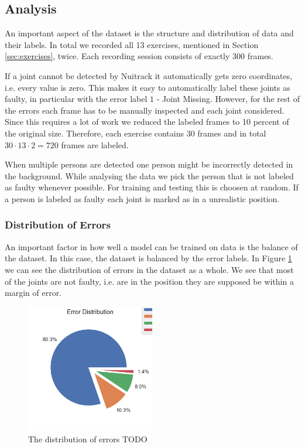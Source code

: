 \subsection{Analysis}

An important aspect of the dataset is the structure and distribution of data and their labels. In total we recorded all 13 exercises, mentioned in Section \ref{sec:exercises}, twice. Each recording session consists of exactly 300 frames.

If a joint cannot be detected by Nuitrack it automatically gets zero coordinates, i.e. every value is zero. This makes it easy to automatically label these joints as faulty, in particular with the error label $1$ - Joint Missing. However, for the rest of the errors each frame has to be manually inspected and each joint considered. Since this requires a lot of work we reduced the labeled frames to 10 percent of the original size. Therefore, each exercise contains 30 frames and in total $30 \cdot 13 \cdot 2 = 720$ frames are labeled.

When multiple persons are detected one person might be incorrectly detected in the background. While analysing the data we pick the person that is not labeled as faulty whenever possible. For training and testing this is choosen at random. If a person is labeled as faulty each joint is marked as in a unrealistic position.

\subsubsection{Distribution of Errors}

An important factor in how well a model can be trained on data is the balance of the dataset. In this case, the dataset is balanced by the error labels. In Figure \ref{fig:statistics_err_dist} we can see the distribution of errors in the dataset as a whole. We see that most of the joints are not faulty, i.e. are in the position they are supposed be within a margin of error.

\begin{figure}
  \centering
  \includegraphics[width=0.5\textwidth]{figures/Data/Error_Distribution.png}
  \caption[Error Distribution]{The distribution of errors TODO}
  \label{fig:statistics_err_dist}
\end{figure}

